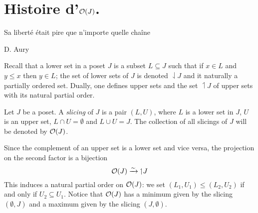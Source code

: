 \section{Histoire d'\texorpdfstring{$\mathcal{O}(J)$}{\O(J)}.}\label{histoire}
\begin{modifyepigraph}{.57}
\epigraph{Sa liberté était pire que n'importe quelle chaîne}{D\@. Aury}
\end{modifyepigraph}
Recall that a lower set in a poset $J$ is a subset $L\subseteq J$ such that if $x\in L$ and $y\leq x$ then $y\in L$; the set of lower sets of $J$ is denoted ${\downharpoonleft} J$ and it naturally a partially ordered set. Dually, one defines upper sets and the set ${\upharpoonleft}J$ of upper sets with its natural partial order.
\begin{definition}\label{slicio}
Let $J$ be a poset. A \emph{slicing} of $J$ is a pair $(L,U)$, where $L$ is a lower set in $J$, $U$ is an upper set, $L\cap U=\emptyset$ and $L\cup U=J$. The collection of all slicings of $J$ will be denoted by $\mathcal{O}(J)$.
\end{definition}

\begin{remark}
Since the complement of an upper set is a lower set and vice versa, the projection on the second factor is a bijection
\[
\mathcal{O}(J)\xrightarrow{\sim} {\upharpoonleft}J
\]
This induces a natural partial order on $\mathcal{O}(J)$: we set $(L_1,U_1)\leq (L_2,U_2)$ if and only if $U_2\subseteq U_1$. Notice that $\mathcal{O}(J)$ has a minimum given by the slicing $(\emptyset,J)$ and a maximum given by the slicing $(J,\emptyset)$.
\end{remark}

